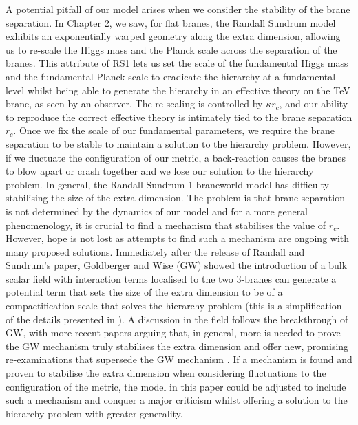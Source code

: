 \documentclass[11pt]{report}
\numberwithin{equation}{chapter}
\begin{document}
A potential pitfall of our model arises when we consider the stability of the brane separation. In Chapter 2, we saw, for flat branes, the Randall Sundrum model exhibits an exponentially warped geometry along the extra dimension, allowing us to re-scale the Higgs mass and the Planck scale across the separation of the branes. This attribute of RS1 lets us set the scale of the fundamental Higgs mass and the fundamental Planck scale to eradicate the hierarchy at a fundamental level whilst being able to generate the hierarchy in an effective theory on the TeV brane, as seen by an observer. The re-scaling is controlled by $\kappa r_c$, and our ability to reproduce the correct effective theory is intimately tied to the brane separation $r_c$. Once we fix the scale of our fundamental parameters, we require the brane separation to be stable to maintain a solution to the hierarchy problem. However, if we fluctuate the configuration of our metric, a back-reaction causes the branes to blow apart or crash together and we lose our solution to the hierarchy problem. In general, the Randall-Sundrum 1 braneworld model has difficulty stabilising the size of the extra dimension. The problem is that brane separation is not determined by the dynamics of our model and for a more general phenomenology, it is crucial to find a mechanism that stabilises the value of $r_c$. However, hope is not lost as attempts to find such a mechanism are ongoing with many proposed solutions. Immediately after the release of Randall and Sundrum's paper, Goldberger and Wise (GW) showed the introduction of a bulk scalar field with interaction terms localised to the two 3-branes can generate a potential term that sets the size of the extra dimension to be of a compactification scale that solves the hierarchy problem (this is a simplification of the details presented in \cite{Goldberger_1999}). A discussion in the field follows the breakthrough of GW, with more recent papers arguing that, in general, more is needed to prove the GW mechanism truly stabilises the extra dimension and offer new, promising re-examinations that supersede the GW mechanism \cite{MAITY2006348}. If a mechanism is found and proven to stabilise the extra dimension when considering fluctuations to the configuration of the metric, the model in this paper could be adjusted to include such a mechanism and conquer a major criticism whilst offering a solution to the hierarchy problem with greater generality.
\end{document}
